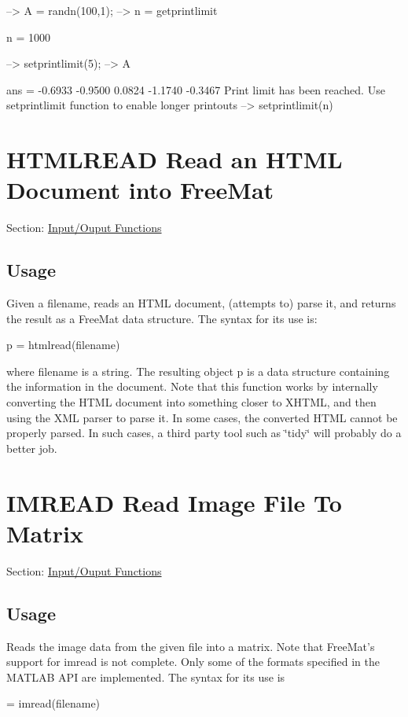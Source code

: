 \begin{DoxyVerbInclude}
--> A = randn(100,1);
--> n = getprintlimit

n = 
 1000 

--> setprintlimit(5);
--> A

ans = 
   -0.6933 
   -0.9500 
    0.0824 
   -1.1740 
   -0.3467
Print limit has been reached.  Use setprintlimit function to enable longer printouts
--> setprintlimit(n)
\end{DoxyVerbInclude}
 \hypertarget{io_htmlread}{}\section{H\-T\-M\-L\-R\-E\-A\-D Read an H\-T\-M\-L Document into Free\-Mat}\label{io_htmlread}
Section\-: \hyperlink{sec_io}{Input/\-Ouput Functions} \hypertarget{vtkwidgets_vtkxyplotwidget_Usage}{}\subsection{Usage}\label{vtkwidgets_vtkxyplotwidget_Usage}
Given a filename, reads an H\-T\-M\-L document, (attempts to) parse it, and returns the result as a Free\-Mat data structure. The syntax for its use is\-: \begin{DoxyVerb}   p = htmlread(filename)
\end{DoxyVerb}
 where {\ttfamily filename} is a {\ttfamily string}. The resulting object {\ttfamily p} is a data structure containing the information in the document. Note that this function works by internally converting the H\-T\-M\-L document into something closer to X\-H\-T\-M\-L, and then using the X\-M\-L parser to parse it. In some cases, the converted H\-T\-M\-L cannot be properly parsed. In such cases, a third party tool such as \char`\"{}tidy\char`\"{} will probably do a better job. \hypertarget{io_imread}{}\section{I\-M\-R\-E\-A\-D Read Image File To Matrix}\label{io_imread}
Section\-: \hyperlink{sec_io}{Input/\-Ouput Functions} \hypertarget{vtkwidgets_vtkxyplotwidget_Usage}{}\subsection{Usage}\label{vtkwidgets_vtkxyplotwidget_Usage}
Reads the image data from the given file into a matrix. Note that Free\-Mat's support for {\ttfamily imread} is not complete. Only some of the formats specified in the M\-A\-T\-L\-A\-B A\-P\-I are implemented. The syntax for its use is \begin{DoxyVerb}   = imread(filename)
\end{DoxyVerb}
